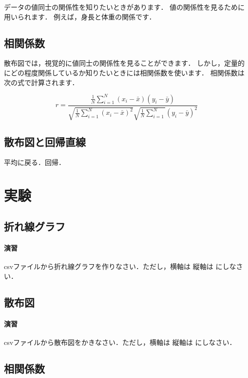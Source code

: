 \documentclass[12pt, a4j]{jreport}
\begin{document}
データの値同士の関係性を知りたいときがあります．
値の関係性を見るために用いられます．
例えば，身長と体重の関係です．


\subsection{相関係数}

散布図では，視覚的に値同士の関係性を見ることができます．
しかし，定量的にどの程度関係しているか知りたいときには相関係数を使います．
相関係数は次の式で計算されます．

\begin{equation}
    \label{eq:1}
    r = \frac{\frac{1}{N} \sum_{i=1}^N (x_i - \bar{x})(y_i - \bar{y})}{\sqrt{\frac{1}{N} \sum_{i=1}^N (x_i - \bar{x})^2} \sqrt{\frac{1}{N} \sum_{i=1}^N}(y_i - \bar{y})^2}
\end{equation}

\subsection{散布図と回帰直線}

平均に戻る．回帰．


\section{実験}

\subsection{折れ線グラフ}

\paragraph{演習}
csvファイルから折れ線グラフを作りなさい．ただし，横軸は 縦軸は にしなさい．

\subsection{散布図}

\paragraph{演習}

csvファイルから散布図をかきなさい．ただし，横軸は 縦軸は にしなさい．


\subsection{相関係数}
\end{document}
